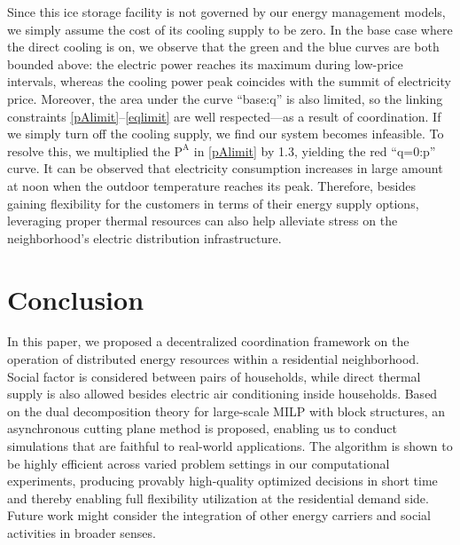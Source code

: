 \documentclass[journal]{IEEEtran}
\begin{document}
Since this ice storage facility is not governed by our energy management models, we simply assume the cost of
its cooling supply to be zero.
In the base case where the direct cooling is on, we observe that the green and the blue curves are both
bounded above: the electric power reaches its maximum during low-price intervals, whereas the cooling
power peak coincides with the summit of electricity price.
Moreover, the area under the curve ``base:q'' is also limited,
so the linking constraints \eqref{pAlimit}--\eqref{eqlimit} are well respected---as a result of coordination.
If we simply turn off the cooling supply, we find our system becomes infeasible.
To resolve this, we multiplied the $\mathrm{P}^\mathrm{A}$ in \eqref{pAlimit} by 1.3, yielding the
red ``q=0:p'' curve.
It can be observed that electricity consumption increases in large amount at noon
when the outdoor temperature reaches its peak.
Therefore, besides gaining flexibility for the customers in terms of their energy supply options, 
leveraging proper thermal resources can also help alleviate stress on the neighborhood's electric
distribution infrastructure.


\section{Conclusion}\label{section:six}
In this paper, we proposed a decentralized coordination framework on the operation of
distributed energy resources within a residential neighborhood.
Social factor is considered between pairs of households, while direct thermal supply
is also allowed besides electric air conditioning inside households.
Based on the dual decomposition theory for large-scale MILP with block structures,
an asynchronous cutting plane method is proposed, enabling us to conduct simulations
that are faithful to real-world applications.
The algorithm is shown to be highly efficient across varied problem settings in our
computational experiments, producing provably high-quality optimized decisions in
short time and thereby enabling full flexibility utilization at the residential demand side.
Future work might consider the integration of other energy carriers
and social activities in broader senses.
\end{document}
